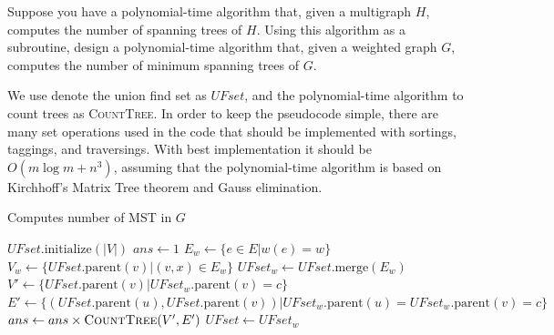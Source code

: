 \documentclass[11pt,a4paper,oneside]{article}
\begin{document}
\begin{problem}{5}
\statement
Suppose you have a polynomial-time algorithm that, given a multigraph $H$,
computes the number of spanning trees of $H$.
Using this algorithm as a subroutine, design a polynomial-time algorithm
that, given a weighted graph $G$, computes the number of 
minimum spanning trees of $G$.

\solution

We use denote the union find set as $UFset$, and the polynomial­-time algorithm to count trees as \textsc{CountTree}. In order to keep the pseudocode simple, there are many set operations used in the code that should be implemented with sortings, taggings, and traversings. With best implementation it should be $O(m \log m + n ^ 3)$, assuming that the polynomial­-time algorithm is based on Kirchhoff's Matrix Tree theorem and Gauss elimination.

\begin{algorithm}
	\caption{Computes number of MST in $G$}
	\begin{algorithmic}[1]
		\State $UFset.\text{initialize}(|V|)$
		\State $ans \gets 1$
		\State $E_w \gets \big\{e \in E \big| w(e) = w\big\}$
		\State $V_w \gets \big\{UFset.\text{parent}(v) \big| (v, x) \in E_w\big\}$
		\State $UFset_w \gets UFset.\text{merge}(E_w)$
				\State $V' \gets \big\{UFset.\text{parent}(v) \big| UFset_w.\text{parent}(v) = c\big\}$
				\State $E' \gets \big\{(UFset.\text{parent}(u), UFset.\text{parent}(v)) \big| UFset_w.\text{parent}(u) = UFset_w.\text{parent}(v) = c\big\}$
				\State $ans \gets ans \times \textsc{CountTree}(V', E')$
			\EndFor
		\State $UFset \gets UFset_w$
		\EndFor
		\EndProcedure
	\end{algorithmic}
\end{algorithm}


\end{problem}
\end{document}
